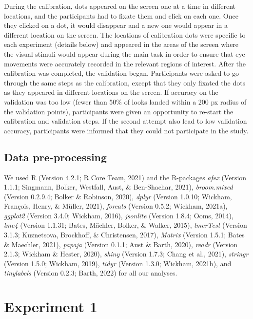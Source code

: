 \documentclass[
  man,floatsintext]{apa6}
\begin{document}
During the calibration, dots appeared on the screen one at a time in
different locations, and the participants had to fixate them and click
on each one. Once they clicked on a dot, it would disappear and a new
one would appear in a different location on the screen. The locations of
calibration dots were specific to each experiment (details below) and
appeared in the areas of the screen where the visual stimuli would
appear during the main task in order to ensure that eye movements were
accurately recorded in the relevant regions of interest. After the
calibration was completed, the validation began. Participants were asked
to go through the same steps as the calibration, except that they only
fixated the dots as they appeared in different locations on the screen.
If accuracy on the validation was too low (fewer than 50\% of looks
landed within a 200 px radius of the validation points),
participants were given an opportunity to re-start the calibration and
validation steps. If the second attempt also lead to low validation
accuracy, participants were informed that they could not participate in
the study.

\hypertarget{data-pre-processing}{%
\subsection{Data pre-processing}\label{data-pre-processing}}

We used R (Version 4.2.1; R Core Team, 2021) and the R-packages \emph{afex} (Version 1.1.1; Singmann, Bolker, Westfall, Aust, \& Ben-Shachar, 2021), \emph{broom.mixed} (Version 0.2.9.4; Bolker \& Robinson, 2020), \emph{dplyr} (Version 1.0.10; Wickham, François, Henry, \& Müller, 2021), \emph{forcats} (Version 0.5.2; Wickham, 2021a), \emph{ggplot2} (Version 3.4.0; Wickham, 2016), \emph{jsonlite} (Version 1.8.4; Ooms, 2014), \emph{lme4} (Version 1.1.31; Bates, Mächler, Bolker, \& Walker, 2015), \emph{lmerTest} (Version 3.1.3; Kuznetsova, Brockhoff, \& Christensen, 2017), \emph{Matrix} (Version 1.5.1; Bates \& Maechler, 2021), \emph{papaja} (Version 0.1.1; Aust \& Barth, 2020), \emph{readr} (Version 2.1.3; Wickham \& Hester, 2020), \emph{shiny} (Version 1.7.3; Chang et al., 2021), \emph{stringr} (Version 1.5.0; Wickham, 2019), \emph{tidyr} (Version 1.3.0; Wickham, 2021b), and \emph{tinylabels} (Version 0.2.3; Barth, 2022) for all our analyses.

\hypertarget{experiment-1}{%
\section{Experiment 1}\label{experiment-1}}
\end{document}
